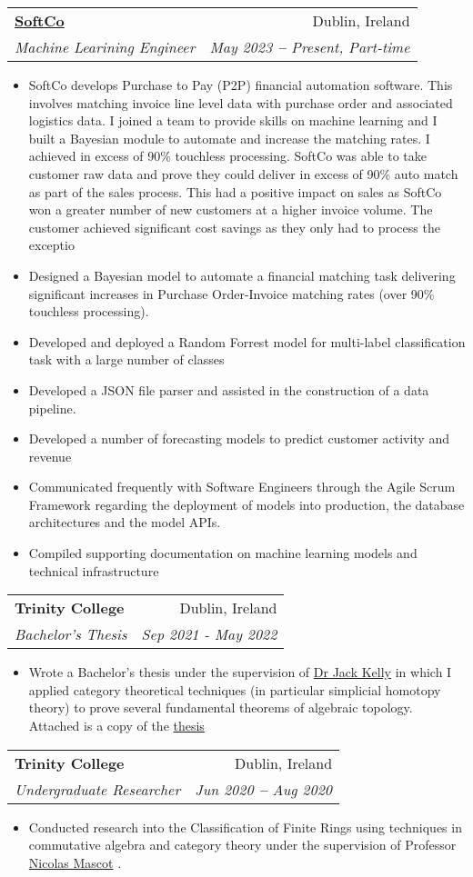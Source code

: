 \documentclass[letterpaper,11pt]{article}
\makeatletter
\newcommand{\resumeItem}[1]{
  \item\small{
    {#1 \vspace{-2pt}}
  }
}
\newcommand{\resumeSubheading}[4]{
  \vspace{-2pt}\item
    \begin{tabular*}{0.97\textwidth}[t]{l@{\extracolsep{\fill}}r}
      \textbf{#1} & #2 \\
      \textit{\small#3} & \textit{\small #4} \\
    \end{tabular*}\vspace{-7pt}
}
\newcommand{\resumeJobSubheading}[5]{
  \vspace{-2pt}\item
    \begin{tabular*}{0.97\textwidth}[t]{l@{\extracolsep{\fill}}r}
      \textbf{#1} & #2 \\
      \textit{\small#3} & \textit{\small #4} \\
    \end{tabular*}\vspace{-7pt}
}
\newcommand{\resumeItemListStart}{\begin{itemize}}
\newcommand{\resumeItemListEnd}{\end{itemize}\vspace{-5pt}}
\makeatother
\begin{document}
    \resumeJobSubheading
      {\href{https://softco.com/}{SoftCo}}{Dublin, Ireland}
      {Machine Learining Engineer}{May 2023 \textbf{--} Present, Part-time}
      { }
        \resumeItemListStart
	\resumeItem{SoftCo develops Purchase to Pay (P2P) financial automation software.  This involves matching invoice line level data with purchase order and associated logistics data.  I joined a team to provide skills on machine learning and I built a Bayesian module to automate and increase the matching rates.  I achieved in excess of 90\% touchless processing.  SoftCo was able to take customer raw data and prove they could deliver in excess of 90\% auto match as part of the sales process.  This had a positive impact on sales as SoftCo won a greater number of new customers at a higher invoice volume.  The customer achieved significant cost savings as they only had to process the exceptio}
            \resumeItem{Designed a Bayesian model to automate a financial matching task delivering significant increases in Purchase Order-Invoice matching rates (over 90\% touchless processing).}
	    \resumeItem{Developed and deployed a Random Forrest model for multi-label classification task with a large number of classes}
	    \resumeItem{Developed a JSON file parser and assisted in the construction of a data pipeline.}
	    \resumeItem{Developed a number of forecasting models to predict customer activity and revenue}
	    \resumeItem{Communicated frequently with Software Engineers through the Agile Scrum Framework regarding the deployment of models into production, the database architectures and the model APIs.}
	    \resumeItem{Compiled supporting documentation on machine learning models and technical infrastructure}
        \resumeItemListEnd

	\resumeSubheading
	{Trinity College}{Dublin, Ireland}
	{Bachelor's Thesis}{Sep 2021 - May 2022}
	\resumeItemListStart
	\resumeItem{Wrote a Bachelor's thesis under the supervision of \href{https://www.maths.tcd.ie/people/kellyj/}{Dr Jack Kelly} in which I applied category theoretical techniques (in particular simplicial homotopy theory) to prove several fundamental theorems of algebraic topology. Attached is a copy of the \href{https://github.com/sam-laing/bachelor-thesis/blob/main/diss.pdf}{thesis}  }
	\resumeItemListEnd

    \resumeSubheading
      {Trinity College}{Dublin, Ireland}
      {Undergraduate Researcher}{Jun 2020 \textbf{--} Aug 2020}
        \resumeItemListStart
	\resumeItem{Conducted research into the Classification of Finite Rings using techniques in commutative algebra and category theory under the supervision of Professor \href{https://www.maths.tcd.ie/~mascotn/}{Nicolas Mascot} .}
        \resumeItemListEnd
\end{document}
